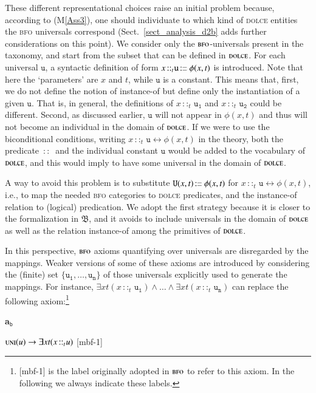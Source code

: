 \documentclass[ao]{iosart2x}
\newcommand{\nb}[1]{\textcolor{red}{$|$}\marginpar{\hspace*{-0cm}\parbox{20mm}{\scriptsize\raggedright\textcolor{red}{#1}}}}
\newcommand{\bflist}{\begin{list}{}{\setlength{\topsep}{2mm}\setlength{\parsep}{0mm}\setlength{\leftmargin}{9.2mm}\setlength{\labelwidth}{8mm}}}
\newcommand{\eflist}{\end{list}}
\newcommand{\bfoAxLabel}{\textrm{a$_\texttt{b}$}}
\newcommand{\dbDefLabel}{\textrm{d$_\texttt{db}$}}
\newcounter{cntaxb}
\newcommand{\bfoax}[1]{\refstepcounter{cntaxb}\begin{small}{\bf \bfoAxLabel\thecntaxb\label{#1}}\end{small}}
\newcounter{cntax}
\newcommand{\refbfoax}[1]{({\bfoAxLabel}\ref{#1})}
\newcommand{\refdbdf}[1]{({\dbDefLabel}\ref{#1})}
\newcommand{\pr}[1]{\mathtt{#1}}
\newcommand{\cn}[1]{\mathtt{#1}}
\newcommand{\ifif}{\leftrightarrow}
\newcommand\textequal{%
 \rule[.08ex]{5pt}{0.35pt}\llap{\rule[.78ex]{5pt}{0.35pt}}}
\newcommand{\sdef}{{\hspace{1.5pt}:\hspace{-2.5pt}\textequal\hspace{3pt}}}
\newcommand{\dolce}{{\textsc{dolce}}}
\newcommand{\bfo}{{\textsc{bfo}}}
\newcommand {\thbfo} {\ensuremath{\mathfrak{B}}}
\newcommand{\bfouniv}{\textsc{uni}}
\newcommand{\bfoiof}[1]{{\,::_{#1\:\!}}}
\begin{document}
These different representational choices raise an initial problem because, according to (M\ref{Ass3}), one should individuate to which kind of {\dolce} entities the {\bfo} universals correspond (Sect.~\ref{sect_analysis_d2b} adds further considerations on this point). 
We consider only 
the {$\bfo$}-universals present in the taxonomy, and start from the subset that can be defined in {$\dolce$}. 
For each universal $\cn{u}$, a syntactic definition of form $x \bfoiof{t} \cn{u} \sdef \phi(x,t)$ is introduced. Note that here the `parameters' are $x$ and $t$, while $\cn{u}$ is a constant. This means that, first, we do not define the notion of instance-of but 
define only the instantiation of a given $\cn{u}$. That is, in general, the definitions of $x \bfoiof{t} \cn{u_1}$ and  $x \bfoiof{t} \cn{u_2}$ could be different. 
Second, as discussed earlier, $\cn{u}$ will not appear in $\phi(x,t)$ and thus will not become an individual in the domain of {$\dolce$}. If we were to use the biconditional conditions, writing $x \bfoiof{t} \cn{u} \ifif \phi(x,t)$ in the theory, both the predicate $\bfoiof{}$ and the individual constant $\cn{u}$ would be added to the vocabulary of {$\dolce$}, and this would imply to have some universal in the domain of {$\dolce$}. 

A way to avoid this problem is to substitute $\pr{U}(x,t) \sdef \phi(x,t)$ for $x \bfoiof{t} \cn{u} \ifif \phi(x,t)$, i.e., to map the needed {\bfo} categories to {\dolce} predicates, and the instance-of relation to (logical) predication. %
We adopt the first strategy because it is closer to the formalization in $\thbfo$, and it avoids
to include universals in the domain of {$\dolce$} as well as the relation instance-of among the primitives of {$\dolce$}.

In this perspective, {$\bfo$} axioms quantifying over universals %
are disregarded by the mappings. Weaker versions of some of these axioms are introduced by considering the (finite) set $\{\cn{u_1}, \dots, \cn{u_n}\}$ of those universals explicitly used to generate the mappings. For instance, $\exists xt(x \bfoiof{t} \cn{u_1}) \land \ldots \land \exists xt(x \bfoiof{t} \cn{u_n})$ can replace  the following axiom:\footnote{[mbf-1] is the label originally adopted in $\bfo$ to refer to this axiom. In the following we always indicate these labels.}
%
\bflist
\item[\bfoax{univ_are_insta}] $\bfouniv(u) \to \exists xt(x \bfoiof{t} u)$ \hfill {\scriptsize [mbf-1]}
\eflist
\end{document}
